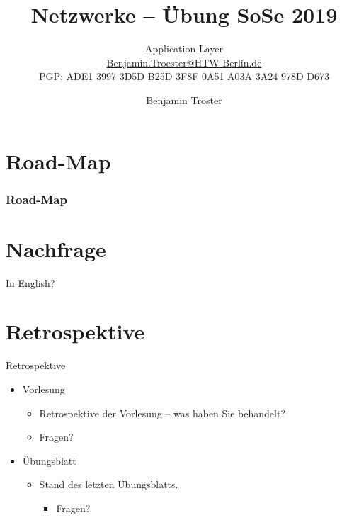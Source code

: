 \documentclass[xcolor=dvipsnames, aspectratio=169]{beamer}
\begin{document}

\title{Netzwerke -- Übung SoSe 2019}
\subtitle{Application Layer\\
		\href{mailto:Benjamin.Troester@HTW-Berlin.de}{Benjamin.Troester@HTW-Berlin.de}\\
		PGP: ADE1 3997 3D5D B25D 3F8F 0A51 A03A 3A24 978D D673 }
\author{Benjamin Tröster}

\date{}

\begin{frame}
\titlepage

\end{frame}

\section*{Road-Map}
\begin{frame}
\frametitle{Road-Map}
\begin{multicols}{2}
  \tableofcontents
\end{multicols}
\end{frame}


\section*{Nachfrage}
\begin{frame}{In English?}

\end{frame}

\section{Retrospektive}
\begin{frame}{Retrospektive}
\begin{itemize}
	\item Vorlesung
	\begin{itemize}
		\item Retrospektive der Vorlesung -- was haben Sie behandelt?
		\item Fragen?
	\end{itemize}
	\item Übungsblatt
	\begin{itemize}
		\item Stand des letzten Übungsblatts.
		\begin{itemize}
			\item Fragen?
		\end{itemize}
	\end{itemize}
\end{itemize}
\end{frame}
\end{document}

